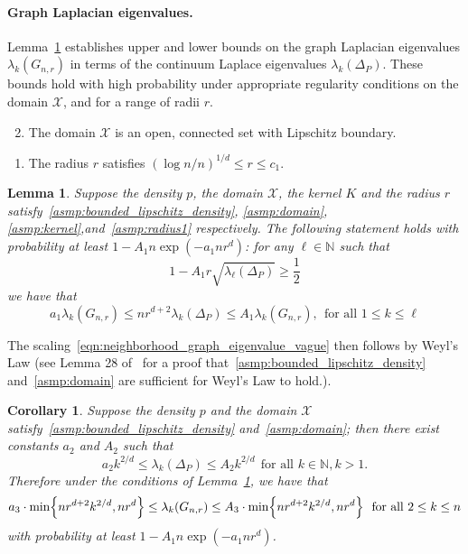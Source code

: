 \documentclass{article}
\newcommand{\1}{\mathbf{1}}
\newcommand{\Xset}{\mathcal{X}}
\theoremstyle{alden}
\theoremstyle{aldenthm}
\newtheorem{lemma}{Lemma}
\newtheorem{corollary}{Corollary}
\theoremstyle{definition}
\theoremstyle{remark}
\begin{document}
\paragraph{Graph Laplacian eigenvalues.} Lemma~\ref{lem:neighborhood_eigenvalue} establishes upper and lower bounds on the graph Laplacian eigenvalues $\lambda_{k}(G_{n,r})$ in terms of the continuum Laplace eigenvalues $\lambda_k(\Delta_P)$. These bounds hold with high probability under appropriate regularity conditions on the domain $\Xset$, and for a range of radii $r$.
\begin{enumerate}[label=(P\arabic*)]
	\setcounter{enumi}{1}
	\item
	\label{asmp:domain}
	The domain $\Xset$ is an open, connected set with Lipschitz boundary.
\end{enumerate}
\begin{enumerate}[label=(R\arabic*)]
	\item
	\label{asmp:radius1}
	The radius $r$ satisfies $(\log n/n)^{1/d} \leq r \leq c_1$.
\end{enumerate}
\begin{lemma}
	\label{lem:neighborhood_eigenvalue}
	Suppose the density $p$, the domain $\Xset$, the kernel $K$ and the radius $r$ satisfy~\ref{asmp:bounded_lipschitz_density}, \ref{asmp:domain}, \ref{asmp:kernel},and~\ref{asmp:radius1} respectively. The following statement holds with probability at least $1 - A_1n\exp(-a_1nr^{d})$: for any $\ell \in \mathbb{N}$ such that
	\begin{equation}
	\label{eqn:neighborhood_eigenvalue_1}
	1 - A_1 r \sqrt{\lambda_{\ell}(\Delta_P)} \geq \frac{1}{2}
	\end{equation}
	we have that
	\begin{equation}
	\label{eqn:eigenvalue_bound}
	a_1 \lambda_k(G_{n,r}) \leq nr^{d+2} \lambda_k(\Delta_P) \leq A_1 \lambda_k(G_{n,r}),~~\textrm{for all $1 \leq k \leq \ell$}
	\end{equation}
\end{lemma}

The scaling~\eqref{eqn:neighborhood_graph_eigenvalue_vague} then follows by Weyl's Law (see Lemma 28 of~\citep{dunlop2020} for a proof that~\ref{asmp:bounded_lipschitz_density} and~\ref{asmp:domain} are sufficient for Weyl's Law to hold.).
\begin{corollary}
	\label{cor:neighborhood_eigenvalue}
	Suppose the density $p$ and the domain $\Xset$ satisfy~\ref{asmp:bounded_lipschitz_density} and~\ref{asmp:domain}; then there exist constants $a_2$ and $A_2$ such that
	\begin{equation}
	\label{eqn:weyls_law}
	a_2k^{2/d} \leq \lambda_k(\Delta_P) \leq A_2k^{2/d}~~\textrm{for all $k \in \mathbb{N}, k > 1$}.
	\end{equation}
	Therefore under the conditions of Lemma~\ref{lem:neighborhood_eigenvalue}, we have that
	\begin{equation}
	\label{eqn:neighborhood_eigenvalue_2}
	a_3 \cdot \min\Bigl\{nr^{d + 2}k^{2/d},nr^d\Bigr\} \leq \lambda_k(G_{n,r}) \leq A_3 \cdot \min\Bigl\{nr^{d + 2}k^{2/d}, nr^d\Bigr\}~~\textrm{for all $2 \leq k \leq n$}
	\end{equation}
	with probability at least $1 - A_1n\exp(-a_1nr^d)$.
\end{corollary}
\end{document}
